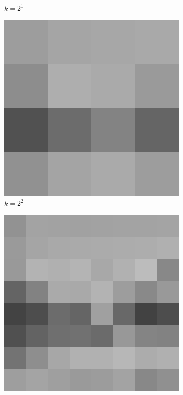 \begin{figure}[H]
\begin{subfigure}[b]{0.3\textwidth}
        \caption{$k = 2^1$}
    \end{subfigure}
    \hfill
    \begin{subfigure}[b]{0.3\textwidth}
        \centering
        \includegraphics[width=\textwidth]{problem2/high_freq_4.bmp}
        \caption{$k = 2^2$}
    \end{subfigure}
    \begin{subfigure}[b]{0.3\textwidth}
        \centering
        \includegraphics[width=\textwidth]{problem2/high_freq_8.bmp}

\end{subfigure}
\end{figure}
